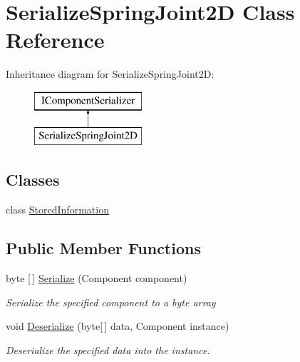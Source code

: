 \hypertarget{class_serialize_spring_joint2_d}{}\section{Serialize\+Spring\+Joint2D Class Reference}
\label{class_serialize_spring_joint2_d}
Inheritance diagram for Serialize\+Spring\+Joint2D\+:\begin{figure}[H]
\begin{center}
\leavevmode
\includegraphics[height=2.000000cm]{class_serialize_spring_joint2_d}
\end{center}
\end{figure}
\subsection*{Classes}
\begin{DoxyCompactItemize}
\item 
class \hyperlink{class_serialize_spring_joint2_d_1_1_stored_information}{Stored\+Information}
\end{DoxyCompactItemize}
\subsection*{Public Member Functions}
\begin{DoxyCompactItemize}
\item 
byte \mbox{[}$\,$\mbox{]} \hyperlink{class_serialize_spring_joint2_d_a74dc25a62ade31ed51b3f47d1097e5e7}{Serialize} (Component component)
\begin{DoxyCompactList}\small\item\em Serialize the specified component to a byte array \end{DoxyCompactList}\item 
void \hyperlink{class_serialize_spring_joint2_d_aac148dbf74d0b00fff9983e677ed4a10}{Deserialize} (byte\mbox{[}$\,$\mbox{]} data, Component instance)
\begin{DoxyCompactList}\small\item\em Deserialize the specified data into the instance. \end{DoxyCompactList}\end{DoxyCompactItemize}


